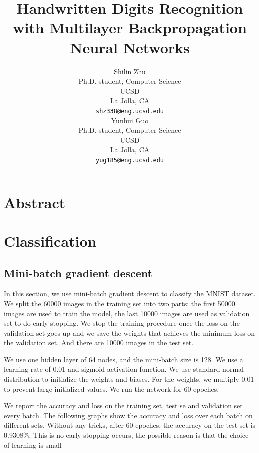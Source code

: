 \documentclass{article} %
\title{Handwritten Digits Recognition with Multilayer Backpropagation Neural Networks}
\author{
Shilin Zhu \\
Ph.D. student, Computer Science\\
UCSD\\
La Jolla, CA \\
\texttt{shz338@eng.ucsd.edu} \\
\And
Yunhui Guo\\
Ph.D. student, Computer Science\\
UCSD\\
La Jolla, CA \\
\texttt{yug185@eng.ucsd.edu} \\
}
\begin{document}
\maketitle
\section{Abstract}

\section{Classification}
\subsection{Mini-batch gradient descent}
In this section, we use mini-batch gradient descent to classify the MNIST dataset. We split the 60000 images in the training set into two parts: the first 50000 images are used to train the model, the last 10000 images are used as validation set to do early stopping. We stop the training procedure once the loss on the validation set goes up and we save the weights that achieves the minimum loss on the validation set. And there are 10000 images in the test set.

We use one hidden layer of 64 nodes, and the mini-batch size is 128. We use a learning rate of 0.01 and sigmoid activation function. We use standard normal distribution to initialize the weights and biases. For the weights, we multiply 0.01 to prevent large initialized values. We run the network for 60 epoches.

 We report the accuracy and loss on the training set, test se and validation set every batch. The following graphs show the accuracy and loss over each batch on different sets. Without any tricks, after 60 epoches, the accuracy on the test set is 0.9308\%. This is no early stopping occurs, the possible reason is that the choice of learning is small
\end{document}

